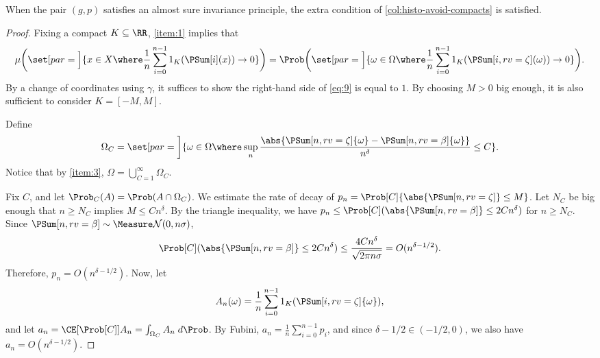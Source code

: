 \documentclass[../main]{subfiles}
\begin{document}
\begin{theorem}\label{thm:avoid-compacts-asip}
  When the pair \((g,p)\) satisfies an almost sure invariance principle, the extra condition of \cref{col:histo-avoid-compacts} is satisfied.
\end{theorem}
\begin{proof}
  Fixing a compact \(K \subseteq \RR\), \cref{item:1} implies that
  \begin{equation}\label{eq:9}
    \mu\rpar[\bigg]{\set[par = \Big]{x \in X \where \frac{1}{n}\sum_{i = 0}^{n - 1}1_K(\PSum[i](x)) \to 0}}
    =
    \Prob\rpar[\bigg]{\set[par = \Big]{\omega \in \Omega \where \frac{1}{n}\sum_{i = 0}^{n - 1}1_K(\PSum[i,rv = \zeta](\omega)) \to 0}}.
  \end{equation}
  By a change of coordinates using \(\gamma\), it suffices to show the right-hand side of \cref{eq:9} is equal to \(1\). By choosing \(M > 0\) big enough, it is also sufficient to consider \(K = [-M,M]\).

  Define
  \[\Omega_C = \set[par = \bigg]{\omega \in \Omega \where \sup_n \frac{\abs{\PSum[n,rv = \zeta]{\omega} - \PSum[n,rv = \beta]{\omega}}}{n^{\delta}} \le C}.\]
  Notice that by \cref{item:3}, \(\Omega = \bigcup_{C = 1}^{\infty} \Omega_C\).

  Fix \(C\), and let \(\Prob_C(A) = \Prob(A \cap \Omega_C)\). We estimate the rate of decay of \(p_n = \Prob[C]{\abs{\PSum[n,rv = \zeta]} \le M}\). Let \(N_C\) be big enough that \(n \ge N_C\) implies \(M \le Cn^{\delta}\). By the triangle inequality, we have \(p_n \le \Prob[C](\abs{\PSum[n,rv = \beta]} \le 2Cn^{\delta})\) for \(n \ge N_C\). Since \(\PSum[n,rv = \beta] \sim \Normal[0][n \sigma]\),
  \begin{equation*}
    \Prob[C](\abs{\PSum[n,rv = \beta]} \le 2Cn^{\delta}) \le \frac{4Cn^{\delta}}{\sqrt{2\pi n \sigma}} = O(n^{\delta - 1/2}).
  \end{equation*}
  Therefore, \(p_n = O(n^{\delta - 1/2})\). Now, let
  \[A_n(\omega) = \frac{1}{n} \sum_{i = 0}^{n - 1} 1_K(\PSum[i,rv = \zeta]{\omega}), \]
  and let \(a_n = \CE[\Prob[C]]{A_n} = \int_{\Omega_C} A_n \;d\Prob\). By Fubini,
  \(a_n = \frac{1}{n} \sum_{i = 0}^{n - 1} p_i\), and since \(\delta - 1/2 \in (-1/2,0)\), we also have \(a_n = O(n^{\delta - 1/2})\).



\end{proof}
\end{document}
